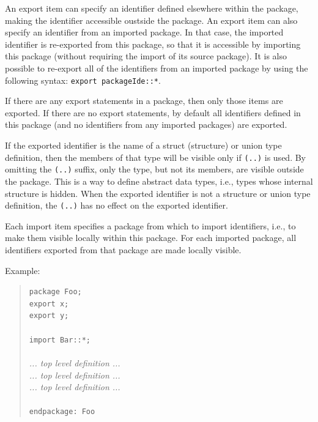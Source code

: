 \documentclass[twoside,letterpaper]{article}
\newcommand{\hm}{\hspace*{1em}}
\newcommand{\te}[1]{\texttt{#1}}
\begin{document}
An export item can specify an identifier defined elsewhere within the
package,  making the identifier accessible oustside the package.
An export item can also specify 
an identifier from an imported package. In that case, the imported 
identifier is re-exported from this package, so that it is accessible
by importing this package (without requiring the import of its source 
package). It is also possible to re-export all of the identifiers 
from an imported package by using the following syntax: 
\texttt{export packageIde::*}.

 
If there are any export statements in a package, then only 
those items are exported. If there are no export statements, 
by default all identifiers defined in this package (and no identifiers 
from any imported packages) are exported. %

If the exported identifier is the name of a struct (structure) or
union type definition, then the members of that type will be visible
only if \texttt{(..)}  is used.  By omitting the \texttt{(..)} suffix, only
the type, but not its members, are visible outside the package.  This
is a way to define abstract data types, i.e., types whose internal
structure is hidden.  When the exported identifier is not a structure
or union type definition, the \te{(..)} has no effect on the exported
identifier. 

Each import item specifies a package from which to import identifiers,
i.e., to make them visible locally within this package.  For each
imported package, all identifiers exported from that package are made
locally visible.

Example:
\begin{quote}
\texttt{package Foo;} \\
\texttt{export x;} \\
\texttt{export y;} \\
\hm \\
\texttt{import Bar::*;} \\
\hm \\
{\rm\emph{... top level definition ...}} \\
{\rm\emph{... top level definition ...}} \\
{\rm\emph{... top level definition ...}} \\
\hm \\
\texttt{endpackage: Foo}
\end{quote}
\end{document}
